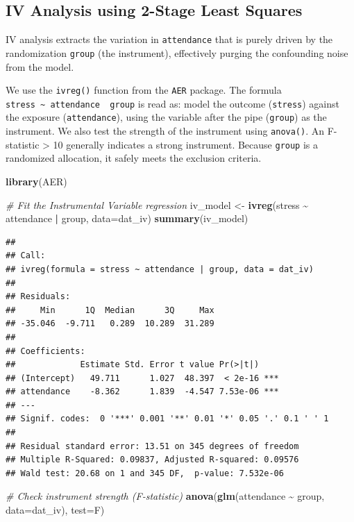 \documentclass[
]{book}
\newenvironment{Shaded}{\begin{snugshade}}{\end{snugshade}}
\newcommand{\AttributeTok}[1]{\textcolor[rgb]{0.13,0.29,0.53}{#1}}
\newcommand{\CommentTok}[1]{\textcolor[rgb]{0.56,0.35,0.01}{\textit{#1}}}
\newcommand{\FunctionTok}[1]{\textcolor[rgb]{0.13,0.29,0.53}{\textbf{#1}}}
\newcommand{\NormalTok}[1]{#1}
\newcommand{\OtherTok}[1]{\textcolor[rgb]{0.56,0.35,0.01}{#1}}
\newcommand{\SpecialCharTok}[1]{\textcolor[rgb]{0.81,0.36,0.00}{\textbf{#1}}}
\newcommand{\StringTok}[1]{\textcolor[rgb]{0.31,0.60,0.02}{#1}}
\begin{document}
\subsection{IV Analysis using 2-Stage Least Squares}\label{iv-analysis-using-2-stage-least-squares}

IV analysis extracts the variation in \texttt{attendance} that is purely driven by the randomization \texttt{group} (the instrument), effectively purging the confounding noise from the model.

We use the \texttt{ivreg()} function from the \texttt{AER} package. The formula \texttt{stress\ \textasciitilde{}\ attendance\ \textbar{}\ group} is read as: model the outcome (\texttt{stress}) against the exposure (\texttt{attendance}), using the variable after the pipe (\texttt{group}) as the instrument.
We also test the strength of the instrument using \texttt{anova()}. An F-statistic \textgreater{} 10 generally indicates a strong instrument. Because \texttt{group} is a randomized allocation, it safely meets the exclusion criteria.

\begin{Shaded}
\begin{Highlighting}[]
\FunctionTok{library}\NormalTok{(AER)}

\CommentTok{\# Fit the Instrumental Variable regression}
\NormalTok{iv\_model }\OtherTok{\textless{}{-}} \FunctionTok{ivreg}\NormalTok{(stress }\SpecialCharTok{\textasciitilde{}}\NormalTok{ attendance }\SpecialCharTok{|}\NormalTok{ group, }\AttributeTok{data=}\NormalTok{dat\_iv)}
\FunctionTok{summary}\NormalTok{(iv\_model)}
\end{Highlighting}
\end{Shaded}

\begin{verbatim}
## 
## Call:
## ivreg(formula = stress ~ attendance | group, data = dat_iv)
## 
## Residuals:
##     Min      1Q  Median      3Q     Max 
## -35.046  -9.711   0.289  10.289  31.289 
## 
## Coefficients:
##             Estimate Std. Error t value Pr(>|t|)    
## (Intercept)   49.711      1.027  48.397  < 2e-16 ***
## attendance    -8.362      1.839  -4.547 7.53e-06 ***
## ---
## Signif. codes:  0 '***' 0.001 '**' 0.01 '*' 0.05 '.' 0.1 ' ' 1
## 
## Residual standard error: 13.51 on 345 degrees of freedom
## Multiple R-Squared: 0.09837, Adjusted R-squared: 0.09576 
## Wald test: 20.68 on 1 and 345 DF,  p-value: 7.532e-06
\end{verbatim}

\begin{Shaded}
\begin{Highlighting}[]
\CommentTok{\# Check instrument strength (F{-}statistic)}
\FunctionTok{anova}\NormalTok{(}\FunctionTok{glm}\NormalTok{(attendance }\SpecialCharTok{\textasciitilde{}}\NormalTok{ group, }\AttributeTok{data=}\NormalTok{dat\_iv), }\AttributeTok{test=}\StringTok{\textquotesingle{}F\textquotesingle{}}\NormalTok{)}
\end{Highlighting}
\end{Shaded}
\end{document}
